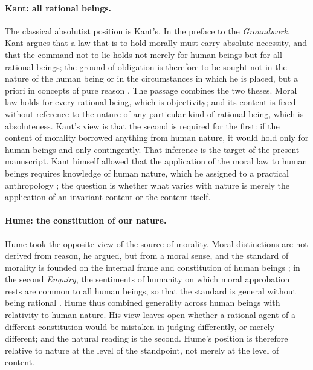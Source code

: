 \documentclass{situationist-preprint}
\begin{document}
\paragraph{Kant: all rational beings.} The classical absolutist position is Kant's. In the preface to the \emph{Groundwork}, Kant argues that a law that is to hold morally must carry absolute necessity, and that the command not to lie holds not merely for human beings but for all rational beings; the ground of obligation is therefore to be sought not in the nature of the human being or in the circumstances in which he is placed, but a priori in concepts of pure reason \citep[4:389]{KantGroundwork}. The passage combines the two theses. Moral law holds for every rational being, which is objectivity; and its content is fixed without reference to the nature of any particular kind of rational being, which is absoluteness. Kant's view is that the second is required for the first: if the content of morality borrowed anything from human nature, it would hold only for human beings and only contingently. That inference is the target of the present manuscript. Kant himself allowed that the application of the moral law to human beings requires knowledge of human nature, which he assigned to a practical anthropology \citep{KantMetaphysicsMorals}; the question is whether what varies with nature is merely the application of an invariant content or the content itself.

\paragraph{Hume: the constitution of our nature.} Hume took the opposite view of the source of morality. Moral distinctions are not derived from reason, he argued, but from a moral sense, and the standard of morality is founded on the internal frame and constitution of human beings \citep[3.1.1]{HumeTreatise}; in the second \emph{Enquiry}, the sentiments of humanity on which moral approbation rests are common to all human beings, so that the standard is general without being rational \citep[App.~I]{HumeEnquiryMorals}. Hume thus combined generality across human beings with relativity to human nature. His view leaves open whether a rational agent of a different constitution would be mistaken in judging differently, or merely different; and the natural reading is the second. Hume's position is therefore relative to nature at the level of the standpoint, not merely at the level of content.
\end{document}
